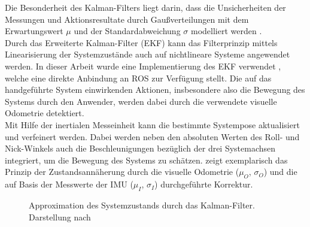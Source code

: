 Die Besonderheit des Kalman-Filters liegt darin, dass die Unsicherheiten der Messungen und Aktionsresultate durch Gaußverteilungen mit dem Erwartungswert $\mu$ und der Standardabweichung $\sigma$ modelliert werden \cite{Hertzberg2012}.\\
Durch das Erweiterte Kalman-Filter (EKF) kann das Filterprinzip mittels Linearisierung der Systemzustände auch auf nichtlineare Systeme angewendet werden. In dieser Arbeit wurde eine Implementierung des EKF verwendet \cite{EKF}, welche eine direkte Anbindung an ROS zur Verfügung stellt. Die auf das handgeführte System einwirkenden Aktionen, insbesondere also die Bewegung des Systems durch den Anwender, werden dabei durch die verwendete visuelle Odometrie detektiert.\\
Mit Hilfe der inertialen Messeinheit kann die bestimmte Systempose aktualisiert und verfeinert werden. Dabei werden neben den absoluten Werten des Roll- und Nick-Winkels auch die Beschleunigungen bezüglich der drei Systemachsen integriert, um die Bewegung des Systems zu schätzen.  zeigt
exemplarisch das Prinzip der Zustandsannäherung durch die visuelle Odometrie ($\mu_O$, $\sigma_O$) und die auf Basis der Messwerte der IMU ($\mu_I$, $\sigma_I$) durchgeführte Korrektur.
%
\begin{figure}[ht]
	\begin{center}%
		\caption{Approximation des Systemzustands durch das Kalman-Filter. Darstellung nach \cite{Hertzberg2012}}
		\label{fig.kalman}
	\end{center}
	\vspace*{-8mm}
\end{figure}




